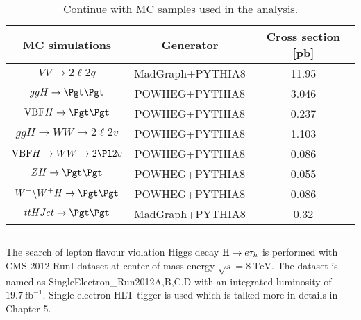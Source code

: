 \begin{table}[!hbpt]
\caption{Continue with MC samples used in the analysis.}
\begin{center}
\begin{tabular}{|c|c|c|}
\hline
MC simulations & Generator & Cross section [pb] \\\hline
$VV \to2\ell 2 q$                                        &  MadGraph+PYTHIA8   &  11.95  \\\hline
$ggH\to \Pgt\Pgt $                                      & POWHEG+PYTHIA8 &      3.046\\\hline
$\textrm{VBF}H\to \Pgt\Pgt $                     & POWHEG+PYTHIA8 &      0.237\\\hline
$ggH\to WW \to 2\ell 2v$                            & POWHEG+PYTHIA8 &      1.103\\\hline
$\textrm{VBF}H\to WW\to 2\Pl 2v$             & POWHEG+PYTHIA8 &    0.086\\\hline
$ZH \to \Pgt\Pgt$                                        & POWHEG+PYTHIA8 &    0.055\\\hline  
$W^{-}\backslash W^{+} H\to\Pgt\Pgt$        & POWHEG+PYTHIA8 &    0.086\\\hline 
$ttHJet \to \Pgt\Pgt$                                   &MadGraph+PYTHIA8&     0.32\\\hline   
\end{tabular}
\end{center}
\label{tab:mutaumcsamples2}
\end{table}


\subsection{\Hehad}

The search of lepton flavour violation Higgs decay $\mathrm{H} \to e \tau_{h}$  is performed with CMS 2012 RunI dataset at center-of-mass energy  $\sqrt{s}=8 ~\textrm{TeV}$. The dataset is named as SingleElectron\_Run2012A,B,C,D with an integrated luminosity of $19.7 ~\textrm{fb}^{-1}$. Single electron HLT tigger is used which is talked more in details in Chapter 5. 


